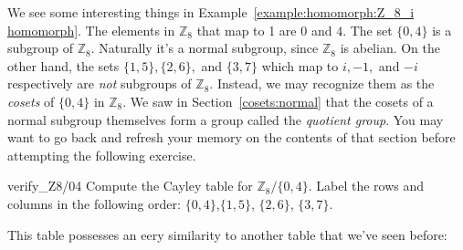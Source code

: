 We see some interesting things in  Example~\ref{example:homomorph:Z_8_i homomorph}. 
The elements in ${\mathbb Z}_8$ that map to 1 are  $0$ and $4$. The set $\{0,4\}$ is a subgroup of ${\mathbb Z}_8$.  Naturally it's a normal subgroup, since $\mathbb{Z}_8$ is abelian.
On the other hand, the sets $\{1,5\}, \{2,6\},$ and $\{3,7\}$ which map to $i, -1,$ and $-i$ respectively are \emph{not} subgroups of ${\mathbb Z}_8$. Instead, we may recognize them as the \emph{cosets} of $\{0,4\}$ in ${\mathbb Z}_8$. We saw in Section~\ref{cosets:normal} 
that the cosets of a normal subgroup themselves form a group called the \emph{quotient group}. You may want
to go back and refresh your memory on the contents of that section before attempting the following exercise. 

%

\begin{exercise}{verify_Z8/04}
Compute the Cayley table for ${\mathbb Z}_8/ \{0,4\}$. Label the rows and columns in the following order:
$\{0,4\}$,$\{1,5\}$, $\{2,6\}$,  $\{3,7\}$. 
\end{exercise}

This table possesses an eery similarity to another table that we've seen before:
%
%

